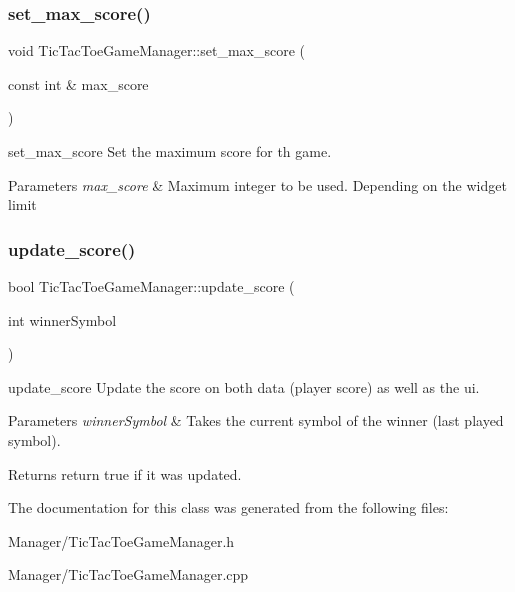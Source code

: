 \subsubsection{\texorpdfstring{set\+\_\+max\+\_\+score()}{set\_max\_score()}}
{\footnotesize\ttfamily void Tic\+Tac\+Toe\+Game\+Manager\+::set\+\_\+max\+\_\+score (\begin{DoxyParamCaption}\item[{const int \&}]{max\+\_\+score }\end{DoxyParamCaption})\hspace{0.3cm}{\ttfamily [inline]}}



set\+\_\+max\+\_\+score Set the maximum score for th game. 


\begin{DoxyParams}{Parameters}
{\em max\+\_\+score} & Maximum integer to be used. Depending on the widget limit \\
\hline
\end{DoxyParams}
\mbox{\label{class_tic_tac_toe_game_manager_a4df4150f4292a51a8f711b3cf62e2608}} 
\subsubsection{\texorpdfstring{update\+\_\+score()}{update\_score()}}
{\footnotesize\ttfamily bool Tic\+Tac\+Toe\+Game\+Manager\+::update\+\_\+score (\begin{DoxyParamCaption}\item[{int}]{winner\+Symbol }\end{DoxyParamCaption})}



update\+\_\+score Update the score on both data (player score) as well as the ui. 


\begin{DoxyParams}{Parameters}
{\em winner\+Symbol} & Takes the current symbol of the winner (last played symbol). \\
\hline
\end{DoxyParams}
\begin{DoxyReturn}{Returns}
return true if it was updated. 
\end{DoxyReturn}


The documentation for this class was generated from the following files\+:\begin{DoxyCompactItemize}
\item 
Manager/Tic\+Tac\+Toe\+Game\+Manager.\+h\item 
Manager/Tic\+Tac\+Toe\+Game\+Manager.\+cpp\end{DoxyCompactItemize}
